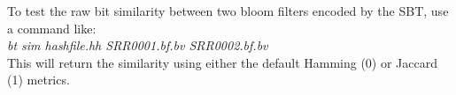 \documentclass{article}
\begin{document}
To test the raw bit similarity between two bloom filters encoded by the SBT, use a command like: \\

\textit{bt sim hashfile.hh SRR0001.bf.bv SRR0002.bf.bv} \\

This will return the similarity using either the default Hamming (0) or Jaccard (1) metrics.
\end{document}
